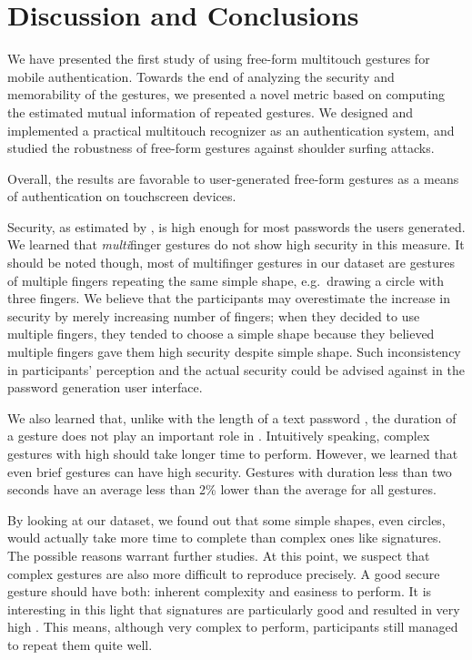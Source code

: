 \documentclass{sig-alternate-10pt}
\begin{document}
\section{Discussion and Conclusions}

We have presented the first study of using free-form multitouch gestures
for mobile authentication. Towards the end of analyzing the security and memorability
of the gestures, we presented a novel metric based on computing the estimated
mutual information of repeated gestures. We designed and implemented a practical
multitouch recognizer as an authentication system, and studied the robustness of
free-form gestures against shoulder surfing attacks.

Overall, the results are favorable to user-generated free-form gestures as a means of authentication on touchscreen devices. 

Security, as estimated by , is high enough for most passwords the users generated. We learned that \emph{multi}finger gestures do not show high security in this measure. It should be noted though, most of multifinger gestures in our dataset are gestures of multiple fingers repeating the same simple shape, e.g.~drawing a circle with three fingers. We believe that the participants may overestimate the increase in security by merely increasing number of fingers; when they decided to use multiple fingers, they tended to choose a simple shape because they believed multiple fingers gave them high security despite simple shape. Such inconsistency in participants' perception and the actual security could be advised against in the password generation user interface. 

We also learned that, unlike with the length of a text password \cite{helpingusers}, the duration of a gesture does not play an important role in . Intuitively speaking, complex gestures with high  should take longer time to perform. However, we learned that even brief gestures can have high security. Gestures with duration less than two seconds have an average  less than 2\% lower than the average  for all gestures.

By looking at our dataset, we found out that some simple shapes, even circles, would actually take more time to complete than complex ones like signatures. The possible reasons warrant further studies. At this point, we suspect that complex gestures are also more difficult to reproduce precisely. A good secure gesture should have both: inherent complexity and easiness to perform. It is interesting in this light that signatures are particularly good and resulted in very high . This means, although very complex to perform, participants still managed to repeat them quite well. 
\end{document}
